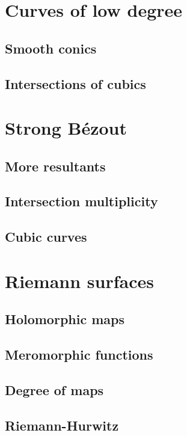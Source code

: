 \documentclass{article}
\begin{document}
\section{Curves of low degree}

\subsection{Smooth conics}

\subsection{Intersections of cubics}

\section{Strong B\'ezout}

\subsection{More resultants}

\subsection{Intersection multiplicity}

\subsection{Cubic curves}

\section{Riemann surfaces}

\subsection{Holomorphic maps}

\subsection{Meromorphic functions}

\subsection{Degree of maps}

\subsection{Riemann-Hurwitz}
\end{document}
